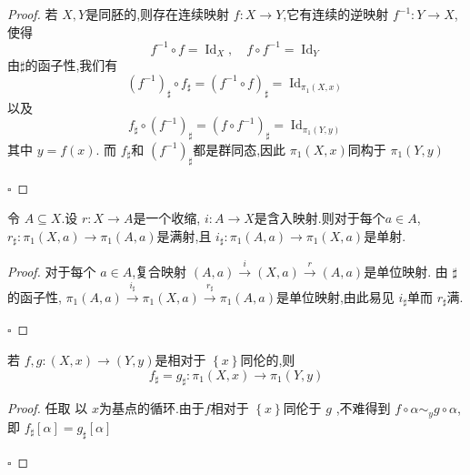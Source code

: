 \documentclass[../../几何与拓扑.tex]{subfiles}
\begin{document}
\begin{proof}

    若 \(  X,Y  \)是同胚的,则存在连续映射 \(  f: X\to Y  \),它有连续的逆映射 \(  f ^{-1} : Y\to X  \),使得 \[
   f^{-1} \circ f =  \operatorname{Id}_{X},\quad  f\circ f^{-1}  =  \operatorname{Id}_{Y}
    \]   由\(  \sharp   \)的函子性,我们有 \[
    \left( f^{-1}  \right)_{\sharp }\circ f_{\sharp }=   \left( f^{-1} \circ f \right)_{\sharp } =  \operatorname{Id}_{\pi _1 \left( X,x \right) } 
    \] 以及 \[
    f_{\sharp }\circ \left( f^{-1}  \right)_{\sharp } =  \left( f\circ f^{-1}  \right)_{\sharp } =  \operatorname{Id}_{\pi _1 \left( Y,y \right) }  
    \]其中 \(  y =  f\left( x \right)   \). 而 \(  f_{\sharp }  \)和 \(  \left( f^{-1}  \right)_{\sharp }   \)都是群同态,因此 \(  \pi _1 \left( X,x \right)   \)同构于 \(  \pi _1 \left( Y,y \right)   \)    

    \hfill $\square$
\end{proof}

\begin{corollary}
    令 \(  A\subseteq X  \).设 \(  r: X \to A  \)是一个收缩, \(  i: A \to X  \)是含入映射.则对于每个\(  a \in A  \),  \(  r_{\sharp }:\pi _1 \left( X,a \right)\to \pi _1 \left( A,a \right)    \)是满射,且 \(  i_{\sharp }:\pi _1 \left( A,a \right)\to \pi _1\left( X,a \right)    \)是单射.     
\end{corollary}

\begin{proof}

    对于每个 \(  a \in A  \),复合映射 \(  \left( A,a \right) \xrightarrow{i}\left( X,a \right) \xrightarrow{r} \left( A,a \right)     \)是单位映射.  
    由 \(  \sharp   \)的函子性, \(  \pi _1 \left( A,a \right) \xrightarrow{i_{\sharp }} \pi _1 \left( X,a \right) \xrightarrow{r_{\sharp }} \pi _1 \left( A,a \right)     \)是单位映射,由此易见 \(  i_{\sharp }  \)单而 \(  r_{\sharp }  \)满. 

    \hfill $\square$
\end{proof}

\begin{theorem}\label{thm:rel-x-topy-impls-induced-map-same}
    若 \(  f,g  : \left( X,x \right)\to \left( Y,y \right)  \)是相对于 \(  \left\{ x \right\}  \)同伦的,则 \[
    f_{\sharp } =  g_{\sharp }: \pi _1 \left( X,x \right)\to \pi _1 \left( Y,y \right)  
    \]  
\end{theorem}
\begin{proof}

    任取 以 \(  x  \)为基点的循环.由于\(  f  \)相对于 \(  \left\{ x \right\}  \)同伦于 \(  g  \)   ,不难得到 \(  f\circ \alpha \sim _{y} g\circ \alpha   \),即 \( f_{\sharp }[\alpha ] =  g_{\sharp }[\alpha  ]  \)    

    \hfill $\square$
\end{proof}
\end{document}
